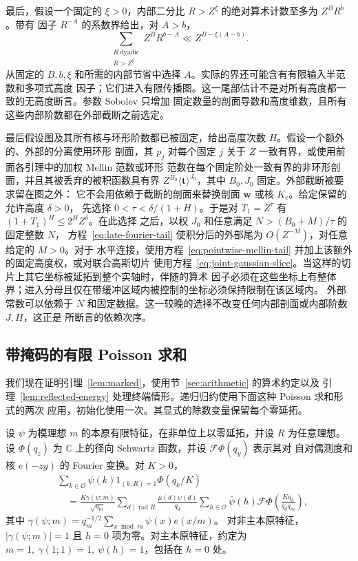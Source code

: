 最后，假设一个固定的 $\xi>0$，内部二分比 $R>Z^\xi$ 的绝对算术计数至多为 $Z^B R^b$。带有
因子 $R^{-A}$ 的系数界给出，对 $A>b$，
\[
 \sum_{\substack{R\ \mathrm{dyadic}\\R>Z^\xi}}Z^B R^{b-A}
       \ll Z^{B-\xi(A-b)}.
\]
从固定的 $B,b,\xi$ 和所需的内部节省中选择 $A$。实际的界还可能含有有限输入半范数和多项式高度
因子；它们进入有限传播图。这一尾部估计不是对所有高度都一致的无高度断言。参数 Sobolev 只增加
固定数量的剖面导数和高度维数，且所有这些内部阶数都在外部截断之前选定。

最后假设图及其所有核与环形阶数都已被固定，给出高度次数 $H$。假设一个额外的、外部的分离使用环形
剖面，其 $p_j$ 对每个固定 $j$ 关于 $Z$ 一致有界，或使用前面各引理中的加权 Mellin 范数或环形
范数在每个固定阶处一致有界的非环形剖面，并且其被丢弃的被积函数具有界
$Z^{B_0}\langle\boldsymbol t\rangle^{J_0}$，其中 $B_0,J_0$ 固定。外部截断被要求留在图之外：
它不会用依赖于截断的剖面来替换剖面 $\boldsymbol w$ 或核 $K_e$。给定保留的允许高度 $\delta>0$，
先选择 $0<\tau<\delta/(1+H)$。于是对 $T_1=Z^\tau$ 有 $(1+T_1)^H\le2^H Z^\delta$。在此选择
之后，以权 $J_0$ 和任意满足 $N>(B_0+M)/\tau$ 的固定整数 $N$，
方程~\eqref{eq:late-fourier-tail} 使积分后的外部尾为 $O(Z^{-M})$，对任意给定的 $M>0$。对于
水平连接，使用方程~\eqref{eq:pointwise-mellin-tail} 并加上该额外的固定高度权，或对联合高斯切片
使用方程~\eqref{eq:joint-gaussian-slice}。当这样的切片上其它坐标被延拓到整个实轴时，伴随的算术
因子必须在这些坐标上有整体界；进入分母且仅在带缓冲区域内被控制的坐标必须保持限制在该区域内。
外部常数可以依赖于 $N$ 和固定数据。这一较晚的选择不改变任何内部剖面或内部阶数 $J,H$，这正是
所断言的依赖次序。

\subsection{带掩码的有限 Poisson 求和}

我们现在证明引理~\ref{lem:marked}，使用节~\ref{sec:arithmetic} 的算术约定以及
引理~\ref{lem:reflected-energy} 处理终端情形。递归归约使用下面这种 Poisson 求和形式的两次
应用，初始化使用一次。其显式的除数变量保留每个零延拓。

\begin{lemma}\label{lem:masked-poisson}
设 \(\psi\) 为模理想 \(m\) 的本原有限特征，在非单位上以零延拓，并设 \(R\) 为任意理想。设
\(\Phi(q_z)\) 为 \(\mathbb C\) 上的径向 Schwartz 函数，并设 \(\mathcal F\Phi(q_y)\) 表示其对
自对偶测度和核 \(e(-zy)\) 的 Fourier 变换。对 \(K>0\)，
\begin{equation}\label{eq:masked-poisson}
 \begin{split}
 &\sum_{k\in\mathcal O}\psi(k)1_{(k,R)=1}\Phi(q_k/K)\\
 &\quad=\frac{K\gamma(\psi;m)}{\sqrt{q_m}}
 \sum_{d\mid\operatorname{rad}R}\frac{\mu(d)\psi(d)}{q_d}
 \sum_{h\in\mathcal O}\bar\psi(h)
       \mathcal F\Phi\!\left(\frac{Kq_h}{q_dq_m}\right),
 \end{split}
\end{equation}
其中
\(\gamma(\psi;m)=q_m^{-1/2}\sum_{x\bmod m}\psi(x)e(x/m)\)。
对非主本原特征，\(|\gamma(\psi;m)|=1\) 且 \(h=0\) 项为零。对主本原特征，约定为
\(m=1,\ \gamma(1;1)=1,\ \psi(h)=1\)，包括在 \(h=0\) 处。
\end{lemma}

